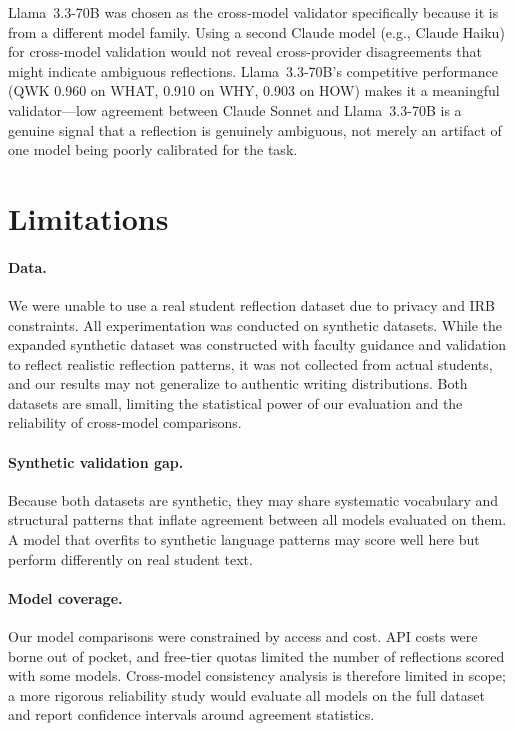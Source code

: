 \documentclass[11pt]{article}
\begin{document}
Llama~3.3-70B was chosen as the cross-model validator specifically because it is from a different model family. Using a second Claude model (e.g., Claude Haiku) for cross-model validation would not reveal cross-provider disagreements that might indicate ambiguous reflections. Llama~3.3-70B's competitive performance (QWK 0.960 on WHAT, 0.910 on WHY, 0.903 on HOW) makes it a meaningful validator—low agreement between Claude Sonnet and Llama~3.3-70B is a genuine signal that a reflection is genuinely ambiguous, not merely an artifact of one model being poorly calibrated for the task.

\section{Limitations}
\label{sec:limitations}

\paragraph{Data.}
We were unable to use a real student reflection dataset due to privacy and IRB constraints. All experimentation was conducted on synthetic datasets. While the expanded synthetic dataset was constructed with faculty guidance and validation to reflect realistic reflection patterns, it was not collected from actual students, and our results may not generalize to authentic writing distributions. Both datasets are small, limiting the statistical power of our evaluation and the reliability of cross-model comparisons.

\paragraph{Synthetic validation gap.}
Because both datasets are synthetic, they may share systematic vocabulary and structural patterns that inflate agreement between all models evaluated on them. A model that overfits to synthetic language patterns may score well here but perform differently on real student text.

\paragraph{Model coverage.}
Our model comparisons were constrained by access and cost. API costs were borne out of pocket, and free-tier quotas limited the number of reflections scored with some models. Cross-model consistency analysis is therefore limited in scope; a more rigorous reliability study would evaluate all models on the full dataset and report confidence intervals around agreement statistics.
\end{document}
